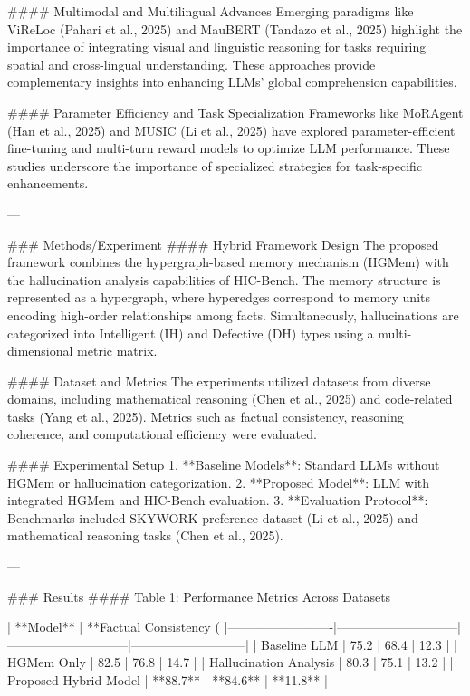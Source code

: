 #### Multimodal and Multilingual Advances
Emerging paradigms like ViReLoc (Pahari et al., 2025) and MauBERT (Tandazo et al., 2025) highlight the importance of integrating visual and linguistic reasoning for tasks requiring spatial and cross-lingual understanding. These approaches provide complementary insights into enhancing LLMs' global comprehension capabilities.

#### Parameter Efficiency and Task Specialization
Frameworks like MoRAgent (Han et al., 2025) and MUSIC (Li et al., 2025) have explored parameter-efficient fine-tuning and multi-turn reward models to optimize LLM performance. These studies underscore the importance of specialized strategies for task-specific enhancements.

---

### Methods/Experiment
#### Hybrid Framework Design
The proposed framework combines the hypergraph-based memory mechanism (HGMem) with the hallucination analysis capabilities of HIC-Bench. The memory structure is represented as a hypergraph, where hyperedges correspond to memory units encoding high-order relationships among facts. Simultaneously, hallucinations are categorized into Intelligent (IH) and Defective (DH) types using a multi-dimensional metric matrix.

#### Dataset and Metrics
The experiments utilized datasets from diverse domains, including mathematical reasoning (Chen et al., 2025) and code-related tasks (Yang et al., 2025). Metrics such as factual consistency, reasoning coherence, and computational efficiency were evaluated.

#### Experimental Setup
1. **Baseline Models**: Standard LLMs without HGMem or hallucination categorization.
2. **Proposed Model**: LLM with integrated HGMem and HIC-Bench evaluation.
3. **Evaluation Protocol**: Benchmarks included SKYWORK preference dataset (Li et al., 2025) and mathematical reasoning tasks (Chen et al., 2025).

---

### Results
#### Table 1: Performance Metrics Across Datasets

| **Model**              | **Factual Consistency (%
|-------------------------|-----------------------------|-----------------------------|---------------------------|
| Baseline LLM           | 75.2                       | 68.4                       | 12.3                      |
| HGMem Only             | 82.5                       | 76.8                       | 14.7                      |
| Hallucination Analysis | 80.3                       | 75.1                       | 13.2                      |
| Proposed Hybrid Model  | **88.7**                   | **84.6**                   | **11.8**                  |


